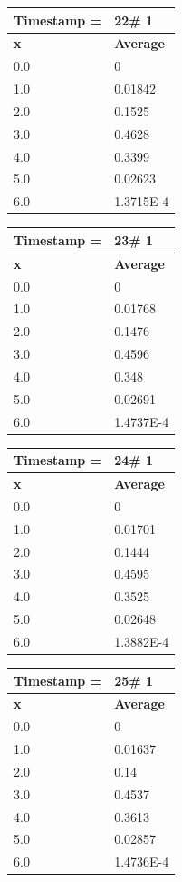 \begin{tabular}{|l||l|}
\hline
\textbf{Timestamp =} & \textbf{22}\# 1\\\hline
	\textbf{x} & \textbf{Average} \\ \hline
\hline
	0.0 & 0 \\ \hline
	1.0 & 0.01842 \\ \hline
	2.0 & 0.1525 \\ \hline
	3.0 & 0.4628 \\ \hline
	4.0 & 0.3399 \\ \hline
	5.0 & 0.02623 \\ \hline
	6.0 & 1.3715E-4 \\ \hline
\end{tabular}
\begin{tabular}{|l||l|}
\hline
\textbf{Timestamp =} & \textbf{23}\# 1\\\hline
	\textbf{x} & \textbf{Average} \\ \hline
\hline
	0.0 & 0 \\ \hline
	1.0 & 0.01768 \\ \hline
	2.0 & 0.1476 \\ \hline
	3.0 & 0.4596 \\ \hline
	4.0 & 0.348 \\ \hline
	5.0 & 0.02691 \\ \hline
	6.0 & 1.4737E-4 \\ \hline
\end{tabular}

\begin{tabular}{|l||l|}
\hline
\textbf{Timestamp =} & \textbf{24}\# 1\\\hline
	\textbf{x} & \textbf{Average} \\ \hline
\hline
	0.0 & 0 \\ \hline
	1.0 & 0.01701 \\ \hline
	2.0 & 0.1444 \\ \hline
	3.0 & 0.4595 \\ \hline
	4.0 & 0.3525 \\ \hline
	5.0 & 0.02648 \\ \hline
	6.0 & 1.3882E-4 \\ \hline
\end{tabular}
\begin{tabular}{|l||l|}
\hline
\textbf{Timestamp =} & \textbf{25}\# 1\\\hline
	\textbf{x} & \textbf{Average} \\ \hline
\hline
	0.0 & 0 \\ \hline
	1.0 & 0.01637 \\ \hline
	2.0 & 0.14 \\ \hline
	3.0 & 0.4537 \\ \hline
	4.0 & 0.3613 \\ \hline
	5.0 & 0.02857 \\ \hline
	6.0 & 1.4736E-4 \\ \hline
\end{tabular}

